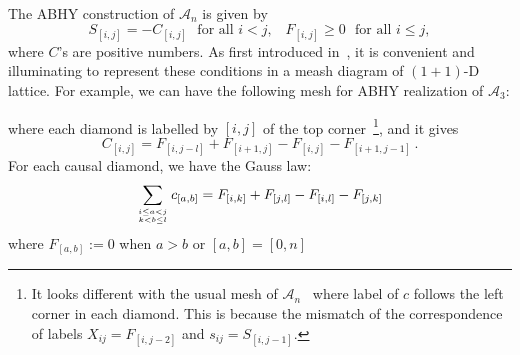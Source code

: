 \documentclass[hidelinks,12pt]{article}
\begin{document}
The ABHY construction of $\mathscr A_n$ is given by 
\[
	S_{[i,j]}=-C_{[i,j]} \,\,\text{ for all $i<j$,}\quad
	F_{[i,j]}\geq 0 \,\,\text{ for all $i\leq j$},
\]
where $C$'s are positive numbers. As first introduced in~\cite{Arkani-Hamed:2019vag,Bazier-Matte:2018rat}, it is convenient and illuminating to represent these conditions in a meash diagram of $(1+1)$-D lattice. For example, we can have the following mesh for ABHY realization of $\mathscr A_3$:  
\begin{center}
\end{center}
where each diamond is labelled by $[i,j]$ of the top corner~\footnote{
It looks different with the usual mesh of $\mathscr A_n$~\cite{Arkani-Hamed:2019vag} where label of $c$ follows the left corner
in each diamond. This is because the mismatch of the correspondence of labels 
$X_{ij}=F_{[i,j-2]}$ and $s_{ij}=S_{[i,j-1]}$.
}, and it gives
\begin{equation}\label{CinFA}
	C_{[i,j]}=F_{[i,j-l]}+F_{[i+1,j]}-F_{[i,j]}-F_{[i+1,j-1]}\,.
\end{equation}
For each causal diamond, we have the Gauss law:
\[
	\sum_{i\leq a<j\atop{k<b\leq l}} c_{[a,b]} = 
	F_{[i,k]}+F_{[j,l]}-F_{[i,l]}-F_{[j,k]}
\]
where $F_{[a,b]}:=0$ when $a>b$ or $[a,b]=[0,n]$
\end{document}
